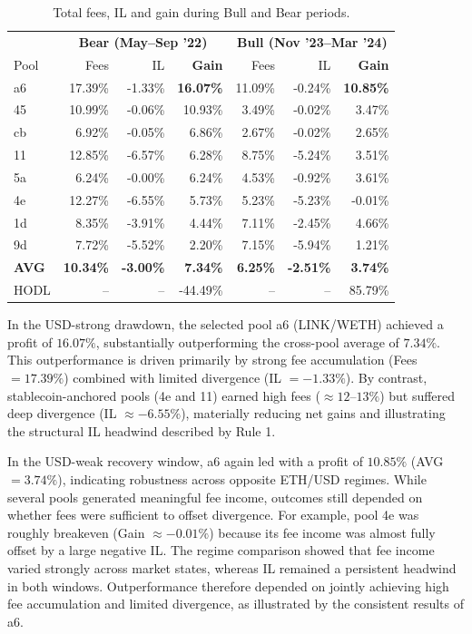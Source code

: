 \documentclass[journal]{IEEEtran}
\begin{document}
\begin{table}[b]
\centering
\scriptsize
\begin{tabular}{lrrr|rrr}
\toprule
& \multicolumn{3}{c}{\textbf{Bear (May--Sep '22)}} & \multicolumn{3}{c}{\textbf{Bull (Nov '23--Mar '24)}} \\
Pool & Fees & IL & \textbf{Gain} & Fees & IL & \textbf{Gain} \\
\midrule
\rowcolor{gray!15}
a6 & 17.39\% & -1.33\% & \textbf{16.07\%} & 11.09\% & -0.24\% & \textbf{10.85\%} \\
45 & 10.99\% & -0.06\% & 10.93\% & 3.49\% & -0.02\% & 3.47\% \\
cb & 6.92\% & -0.05\% & 6.86\% & 2.67\% & -0.02\% & 2.65\% \\
11 & 12.85\% & -6.57\% & 6.28\% & 8.75\% & -5.24\% & 3.51\% \\
5a & 6.24\% & -0.00\% & 6.24\% & 4.53\% & -0.92\% & 3.61\% \\
4e & 12.27\% & -6.55\% & 5.73\% & 5.23\% & -5.23\% & -0.01\% \\
1d & 8.35\% & -3.91\% & 4.44\% & 7.11\% & -2.45\% & 4.66\% \\
9d & 7.72\% & -5.52\% & 2.20\% & 7.15\% & -5.94\% & 1.21\% \\
\midrule
\textbf{AVG} & \textbf{10.34\%} & \textbf{-3.00\%} & \textbf{7.34\%} & \textbf{6.25\%} & \textbf{-2.51\%} & \textbf{3.74\%} \\
HODL & -- & -- & -44.49\% & -- & -- & 85.79\% \\
\bottomrule
\end{tabular}
\caption{Total fees, IL and gain during Bull and Bear periods.}
\label{tab:case_bear_bull}
\end{table}

In the USD-strong drawdown, the selected pool a6 (LINK/WETH) achieved a profit of $16.07\%$, substantially outperforming the cross-pool average of $7.34\%$. This outperformance is driven primarily by strong fee accumulation (Fees $=17.39\%$) combined with limited divergence (IL $=-1.33\%$). By contrast, stablecoin-anchored pools (4e and 11) earned high fees ($\approx 12\text{--}13\%$) but suffered deep divergence (IL $\approx -6.55\%$), materially reducing net gains and illustrating the structural IL headwind described by Rule 1.

In the USD-weak recovery window, a6 again led with a profit of $10.85\%$ (AVG $=3.74\%$), indicating robustness across opposite ETH/USD regimes. 
While several pools generated meaningful fee income, outcomes still depended on whether fees were sufficient to offset divergence. 
For example, pool 4e was roughly breakeven (Gain $\approx -0.01\%$) because its fee income was almost fully offset by a large negative IL. 
The regime comparison showed that fee income varied strongly across market states, whereas IL remained a persistent headwind in both windows. 
Outperformance therefore depended on jointly achieving high fee accumulation and limited divergence, as illustrated by the consistent results of a6.
\end{document}
